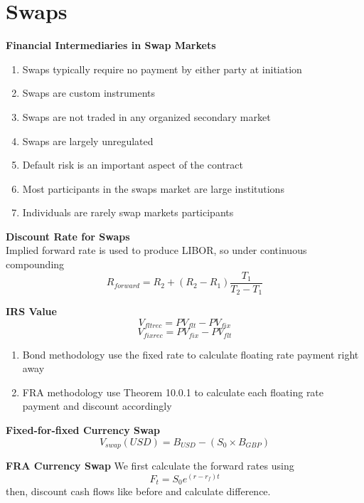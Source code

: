 \documentclass[11pt,fleqn]{book} %
\numberwithin{equation}{section} %
\numberwithin{figure}{section} %
\numberwithin{table}{section} %
\begin{document}
\chapter{Swaps}
\begin{definition}\textbf{Financial Intermediaries in Swap Markets}
\begin{enumerate}
    \item Swaps typically require no payment by either party at initiation
    \item Swaps are custom instruments
    \item Swaps are not traded in any organized secondary market
    \item Swaps are largely unregulated
    \item Default risk is an important aspect of the contract
    \item Most participants in the swaps market are large institutions
    \item Individuals are rarely swap markets participants
\end{enumerate}
\end{definition}
\begin{theorem}\textbf{Discount Rate for Swaps}\\
Implied forward rate is used to produce LIBOR, so under continuous compounding
$$
R_{forward}=R_2+(R_2-R_1)\frac{T_1}{T_2-T_1}
$$
\end{theorem}
\begin{theorem}\textbf{IRS Value}
$$
V_{fltrec}=PV_{flt}-PV_{fix}
$$
$$
V_{fixrec}=PV_{fix}-PV_{flt}
$$
\end{theorem}
\begin{remark}
\begin{enumerate}
    \item Bond methodology use the fixed rate to calculate floating rate payment right away
    \item FRA methodology use Theorem 10.0.1 to calculate each floating rate payment and discount accordingly
\end{enumerate}
\end{remark}
\begin{theorem}\textbf{Fixed-for-fixed Currency Swap}
$$
V_{swap}(USD)=B_{USD}-(S_0\times B_{GBP})
$$
\end{theorem}
\begin{theorem}\textbf{FRA Currency Swap}
We first calculate the forward rates using
$$
F_t=S_0e^{(r-r_f)t}
$$
then, discount cash flows like before and calculate difference.
\end{theorem}
\end{document}
